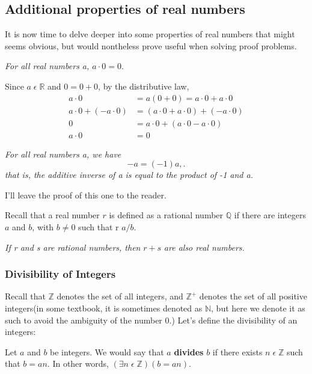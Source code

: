 \documentclass[a4paper]{article}
\begin{document}
\subsection{Additional properties of real numbers}
It is now time to delve deeper into some properties of real numbers that might seems obvious, but would nontheless prove useful when solving proof problems.

 \begin{tcolorbox}
	 \textit{For all real numbers a, $a \cdot 0 = 0.$ }
\end{tcolorbox}
Since $a \; \epsilon \; \mathbb{R}$ and  $0 = 0 + 0$, by the distributive law,
\begin{align*}
	a \cdot  0 &= a\left( 0 + 0 \right) = a \cdot 0 + a \cdot  0 \\
a \cdot 0 + \left( -a \cdot  0 \right) &= \left( a \cdot  0 + a \cdot 0 \right) + \left( -a \cdot  0 \right)\\
0 &= a \cdot  0 + \left( a \cdot  0 - a \cdot 0 \right) \\
a \cdot 0 &= 0
\end{align*}

\begin{tcolorbox}
	\textit{For all real numbers a, we have}\[
	-a = \left( -1 \right)a, 
	.\] 
	\textit{that is, the additive inverse of a is equal to the product of -1 and a.}
\end{tcolorbox}
I'll leave the proof of this one to the reader.


Recall that a real number $r$ is defined as a rational number $\mathbb{Q}$ if there are integers $a$ and  $b$, with $b \neq 0$ such  that r $a / b$.
\begin{tcolorbox}[title=The Closure Property of Rational Numbers]
	\textit{If r and s are rational numbers, then }$r + s$	\textit{ are also real numbers.}
\end{tcolorbox}


\subsubsection{Divisibility of Integers}
Recall that $\mathbb{Z}$ denotes the set of all integers, and $\mathbb{Z}^{+}$ denotes the set of all positive integers(in some textbook, it is sometimes denoted as $\mathbb{N}$, but here we denote it as such to avoid the ambiguity of the number 0.) Let's define the divisibility of an integers:

\begin{tcolorbox}[title=Definition]
	Let $a$ and $b$ be integers. We would say that  $a$  \textbf{divides} $b$ if there exists $n \; \epsilon \; \mathbb{Z}$ such that $b = an$. In other words,  $\left( \exists  n \; \epsilon \; \mathbb{Z} \right)\left( b = an \right)  $.	
\end{tcolorbox}
\end{document}
